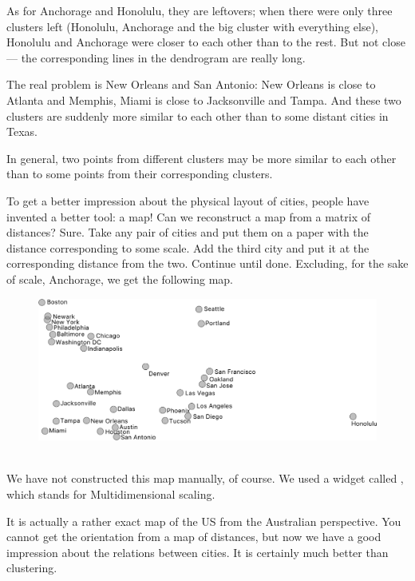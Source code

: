 As for Anchorage and Honolulu, they are leftovers; when there were only three clusters left (Honolulu, Anchorage and the big cluster with everything else), Honolulu and Anchorage were closer to each other than to the rest. But not close — the corresponding lines in the dendrogram are really long.

The real problem is New Orleans and San Antonio: New Orleans is close to Atlanta and Memphis, Miami is close to Jacksonville and Tampa. And these two clusters are suddenly more similar to each other than to some distant cities in Texas.

In general, two points from different clusters may be more similar to each other than to some points from their corresponding clusters.

To get a better impression about the physical layout of cities, people have invented a better tool: a map! Can we reconstruct a map from a matrix of distances? Sure. Take any pair of cities and put them on a paper with the distance corresponding to some scale. Add the third city and put it at the corresponding distance from the two. Continue until done. Excluding, for the sake of scale, Anchorage, we get the following map.

\begin{figure}[h]
    \centering
    \includegraphics[width=\linewidth]{mds-jitter.png}
    \caption{$\;$}
\end{figure}

We have not constructed this map manually, of course. We used a widget called , which stands for Multidimensional scaling.

It is actually a rather exact map of the US from the Australian perspective. You cannot get the orientation from a map of distances, but now we have a good impression about the relations between cities. It is certainly much better than clustering.

